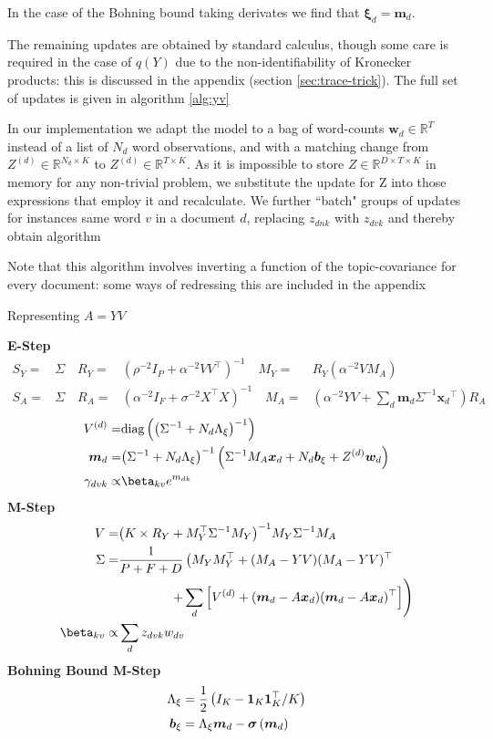 \documentclass[10pt,fleqn]{article}
\newcommand \halve[1] {
	\frac{#1}{2}
}
\newcommand \half {
    \halve{1}
}
\newcommand \T { ^\top }
\newcommand \vv[1] { \bm #1 }
\newcommand \diag[1] { \text{diag} \left( {#1} \right) }
\newcommand \Ed {{ \vv{\xi}_d}}
\newcommand \Axi { { \Lambda_{\xi} } }
\newcommand \bxi { { \vv{b}_{\xi} } }
\newcommand \xd      { { \vv x_d } }
\newcommand \beta[1]  { \mathcal{B}eta \left( {#1}, {#2} \right) }
\newcommand \VReal[1] { { \mathbb{R}^{#1} } }
\newcommand \MReal[2] { { \mathbb{R}^{#1 \times #2} } }
\newcommand \inv[1] { {#1}^{-1} }
\newcommand \invb[1] { \inv{\left( #1 \right)} }
\newcommand \md   { \vv{m}_d }
\begin{document}
In the case of the Bohning bound taking derivates we find that $\Ed = \md$.

The remaining updates are obtained by standard calculus, though some care is required in the case of $q(Y)$ due to the non-identifiability of Kronecker products: this is discussed in the appendix (section \ref{sec:trace-trick}). The full set of updates is given in algorithm \ref{alg:yv}

In our implementation we adapt the model to a bag of word-counts $\vv{w}_d \in \VReal{T}$ instead of a list of $N_d$ word observations, and with a matching change from $Z^{(d)} \in \MReal{N_d}{K}$ to $Z^{(d)} \in \MReal{T}{K}$. As it is impossible to store $Z \in \mathbb{R}^{D\times T \times K}$ in memory for any non-trivial problem, we substitute the update for Z into those expressions that employ it and recalculate. We further ``batch" groups of updates for instances same word $v$ in a document $d$, replacing $z_{dnk}$ with $z_{dvk}$ and thereby obtain algorithm 

Note that this algorithm involves inverting a function of the topic-covariance for every document: some ways of redressing this are included in the appendix


\begin{algorithm}
\caption{Representing $A=YV$}
\label{alg:yv}
$\text{ }$\\
{\bf E-Step}
    \begin{align*}
        S_Y = & \Sigma \quad R_Y = & \invb{\rho^{-2} I_P + \alpha^{-2}V V \T}
        \quad M_Y = & R_Y \left( \alpha^{-2} V M_A \right) \\
        S_A = & \Sigma \quad R_A = & \invb{\alpha^{-2} I_F + \sigma^{-2} X\T X} 
        \quad M_A = & \left(\alpha^{-2} YV + \sum_d \md \inv{\Sigma} \xd\T\right)R_A
    \end{align*}
    \begin{align*}
         \Vd = & \diag{\invb{\inv{\Sigma} + N_d \Axi}}\\
         \md = & \invb{\inv{\Sigma} + N_d \Axi} \left(\inv{\Sigma} M_A \xd  + N_d \bxi + Z^{(d)}\vv{w}_d \right )\\
        \gamma_{dvk} \propto & \beta_{kv} e^{m_{dk}} 
\end{align*}
{\bf M-Step}
\begin{align*}
    V = & \invb{K \times R_Y + M_Y\T \inv{\Sigma} M_Y}M_Y \inv{\Sigma} M_A \\
    \Sigma = & \frac{1}{P+F+D} \left(M_Y M_Y\T + (M_A - Y V)(M_A - Y V)\T \right. \\
        & \qquad \qquad \left. + \sum_d \left[ \Vd + (\md - A \xd)(\md - A\xd)\T \right] \right)\\
     \beta_{kv} \propto & \sum_d z_{dvk} w_{dv} 
\end{align*}
{\bf Bohning Bound M-Step}
    \begin{align*}
        \Axi & = \half \left(I_K - \mathbf{1}_K\mathbf{1}_K\T / K  \right) \\
        \bxi & = \Axi \md  - \sigmoid{\md}
    \end{align*}
\end{algorithm}
\end{document}
